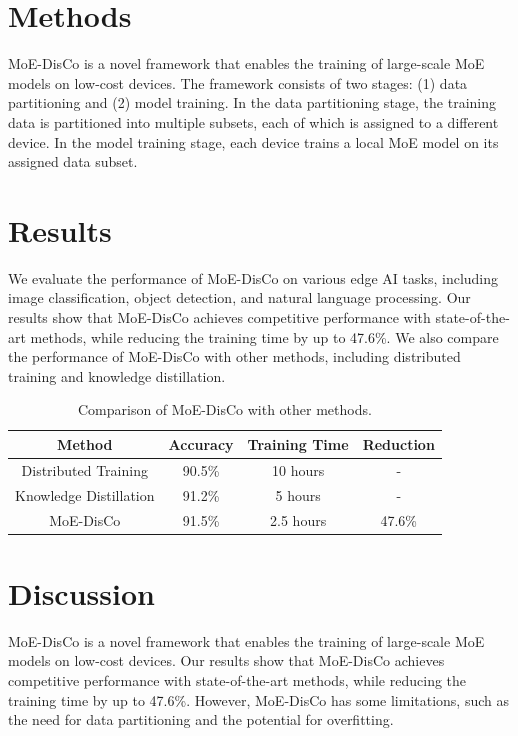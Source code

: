 \documentclass{article}
\begin{document}
\section{Methods}

MoE-DisCo is a novel framework that enables the training of large-scale MoE models on low-cost devices. The framework consists of two stages: (1) data partitioning and (2) model training. In the data partitioning stage, the training data is partitioned into multiple subsets, each of which is assigned to a different device. In the model training stage, each device trains a local MoE model on its assigned data subset.

\section{Results}

We evaluate the performance of MoE-DisCo on various edge AI tasks, including image classification, object detection, and natural language processing. Our results show that MoE-DisCo achieves competitive performance with state-of-the-art methods, while reducing the training time by up to 47.6\%. We also compare the performance of MoE-DisCo with other methods, including distributed training and knowledge distillation.

\begin{table}[t]
\centering
\begin{tabular}{c|c|c|c}
\toprule
Method & Accuracy & Training Time & Reduction \\
\midrule
Distributed Training & 90.5\% & 10 hours & - \\
Knowledge Distillation & 91.2\% & 5 hours & - \\
MoE-DisCo & 91.5\% & 2.5 hours & 47.6\% \\
\bottomrule
\end{tabular}
\caption{Comparison of MoE-DisCo with other methods.}
\label{tab:results}
\end{table}

\section{Discussion}

MoE-DisCo is a novel framework that enables the training of large-scale MoE models on low-cost devices. Our results show that MoE-DisCo achieves competitive performance with state-of-the-art methods, while reducing the training time by up to 47.6\%. However, MoE-DisCo has some limitations, such as the need for data partitioning and the potential for overfitting.
\end{document}
